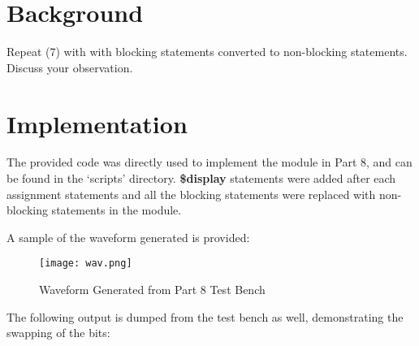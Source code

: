 \documentclass[paper=usletter, fontsize=12pt]{article}
\begin{document}
    \vspace{-0.1in}

    \section{Background}
    Repeat (7) with with blocking statements converted to non-blocking statements. Discuss your observation.

    \section{Implementation}
    The provided code was directly used to implement the module in Part 8, and can be found in the `scripts' directory. \textbf{\$display} statements were added after each assignment statements and all the blocking statements were replaced with non-blocking statements in the module.

    A sample of the waveform generated is provided:

    \begin{figure}[ht]
        \begin{center}
            \texttt{[image: wav.png]}
            \caption{Waveform Generated from Part 8 Test Bench} \label{fig:wav}
        \end{center}
    \end{figure}

    The following output is dumped from the test bench as well, demonstrating the swapping of the bits:
\end{document}
